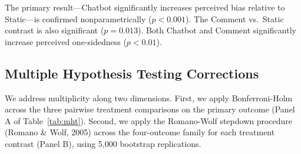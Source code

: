 \documentclass[12pt]{article}
\begin{document}
The primary result---Chatbot significantly increases perceived bias relative to Static---is confirmed nonparametrically ($p<0.001$). The Comment vs.\ Static contrast is also significant ($p=0.013$). Both Chatbot and Comment significantly increase perceived one-sidedness ($p<0.01$).

\subsection{Multiple Hypothesis Testing Corrections}

We address multiplicity along two dimensions. First, we apply Bonferroni-Holm across the three pairwise treatment comparisons on the primary outcome (Panel A of Table~\ref{tab:mht}). Second, we apply the Romano-Wolf stepdown procedure (Romano \& Wolf, 2005) across the four-outcome family for each treatment contrast (Panel B), using 5,000 bootstrap replications.
\end{document}
